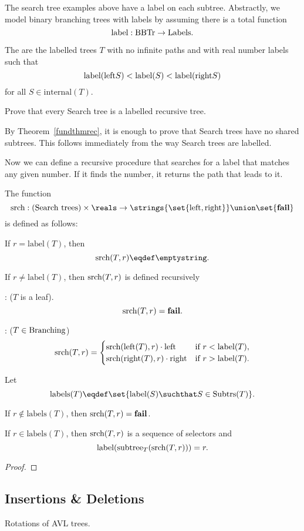 The search tree examples above have a label on each subtree.
Abstractly, we model binary branching trees with labels by assuming
there is a total function
\[
\text{label}:\text{BBTr} \to \text{Labels}.
\]

\begin{definition}
The  are the labelled trees $T$ with no infinite
paths and with real number labels such that
\[
\text{label}(\text{left}S) < \text{label}(S) < \text{label}(\text{right}S)
\]
for all $S \in \text{internal}(T)$.
\end{definition}

\begin{problem}
Prove that every Search tree is a labelled recursive tree.

\begin{solution}
By Theorem~\ref{fundthmrec}, it is enough to prove that Search trees
have no shared subtrees.  This follows immediately from the way Search
trees are labelled.
\end{solution}
\end{problem}

Now we can define a recursive procedure that searches for a label that
matches any given number.  If it finds the number, it returns the path
that leads to it.

\begin{definition}
The function
\[
\srchtr{}: \text{(Search trees)} \times \reals \to
\strings{\set{\leftsub{},\rightsub{}}} \union \set{\textbf{fail}}
\]
is defined as follows:

If $r = \text{label}(T)$, then
\[
\srchtr{(T,r)} \eqdef \emptystring.
\]

If $r \neq \text{label}(T)$, then $\text{srch}(T,r)$ is defined recursively

: ($T$ is a leaf).
\[
\text{srch}(T,r) = \textbf{fail}.
\]

: ($T \in \text{Branching}$)
\[
\text{srch}(T,r) = \begin{cases} 
\text{srch}(\text{left}(T),r) \cdot \text{left} & \text{if $r < \text{label}(T)$},\\
\text{srch}(\text{right}(T),r)\cdot \text{right}& \text{if $r > \text{label}(T)$}.
\end{cases}
\]
\end{definition}

\begin{theorem}
Let
\[
\text{labels}(T) \eqdef \set{\text{label}(S) \suchthat S \in \subbrn{T}}.
\]

If $r \notin \text{labels}(T)$, then $\text{srch}(T,r) = \textbf{fail}$.  

If $r \in \text{labels}(T)$, then $\text{srch}(T,r)$ is a sequence of
selectors and
\[
\text{label}(\text{subtree}_{T}(\text{srch}(T,r))) = r.
\]
\end{theorem}

\begin{proof}


\end{proof}

\subsection{Insertions \& Deletions}

Rotations of AVL trees.


  \endinput
